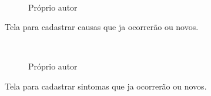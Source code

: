 \begin{figure}[H]
		\caption{\label{Cadastro_Epi_Sistema}Próprio autor}
	\centering
	\mbox{%
		\qquad
	}
	
\end{figure}
\newpage

Tela para cadastrar causas que ja ocorrerão ou novos.

\begin{figure}[H]
		\caption{\label{Cadastro_Causa_Defeito}Próprio autor}
	\centering
	\mbox{%
		\qquad
	}
	
\end{figure}
\newpage

Tela para cadastrar sintomas que ja ocorrerão ou novos.

